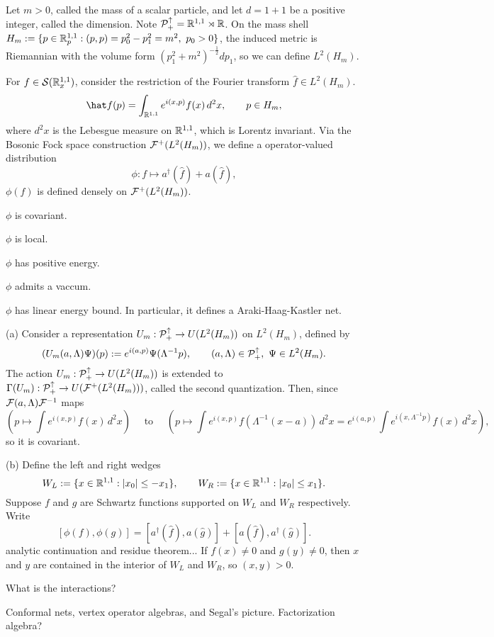 \documentclass{../../large}
\begin{document}
\begin{prb}
Let $m>0$, called the mass of a scalar particle, and let $d=1+1$ be a positive integer, called the dimension.
Note $\mathcal{P}_+^\uparrow=\mathbb{R}^{1,1}\rtimes\mathbb{R}$.
On the mass shell $H_m:=\{p\in\R^{1,1}_p:(p,p)=p_0^2-p_1^2=m^2,\ p_0>0\}$, the induced metric is Riemannian with the volume form $(p_1^2+m^2)^{-\frac12}dp_1$, so we can define $L^2(H_m)$.

For $f\in\mathcal{S}(\mathbb{R}^{1,1}_x)$, consider the restriction of the Fourier transform $\hat f\in L^2(H_m)$.
\[\hat f(p)=\int_{\R^{1,1}}e^{i(x,p)}f(x)\,d^2x,\qquad p\in H_m,\]
where $d^2x$ is the Lebesgue measure on $\mathbb{R}^{1,1}$, which is Lorentz invariant.
Via the Bosonic Fock space construction $\mathcal{F}^+(L^2(H_m))$, we define a operator-valued distribution
\[\phi:f\mapsto a^\dagger(\hat f)+a(\hat f),\]
$\phi(f)$ is defined densely on $\mathcal{F}^+(L^2(H_m))$.


\begin{parts}
\item $\phi$ is covariant.
\item $\phi$ is local.
\item $\phi$ has positive energy.
\item $\phi$ admits a vaccum.
\item $\phi$ has linear energy bound. In particular, it defines a Araki-Haag-Kastler net.
\end{parts}
\end{prb}
\begin{pf}
(a)
Consider a representation $U_m:\mathcal{P}_+^\uparrow\to U(L^2(H_m))$ on $L^2(H_m)$, defined by
\[(U_m(a,\Lambda)\Psi)(p):=e^{i(a,p)}\Psi(\Lambda^{-1}p),\qquad(a,\Lambda)\in\cP_+^\uparrow,\ \Psi\in L^2(H_m).\]
The action $U_m:\mathcal{P}_+^\uparrow\to U(L^2(H_m))$ is extended to $\Gamma(U_m):\mathcal{P}_+^\uparrow\to U(\mathcal{F}^+(L^2(H_m)))$, called the second quantization.
Then, since $\mathcal{F}(a,\Lambda)\mathcal{F}^{-1}$ maps
\[(p\mapsto\int e^{i(x,p)}f(x)\,d^2x)\quad\text{ to }\quad(p\mapsto\int e^{i(x,p)}f(\Lambda^{-1}(x-a))\,d^2x=e^{i(a,p)}\int e^{i(x,\Lambda^{-1}p)}f(x)\,d^2x),\]
so it is covariant.

(b)
Define the left and right wedges
\[W_L:=\{x\in\mathbb{R}^{1,1}:|x_0|\le-x_1\},\qquad W_R:=\{x\in\mathbb{R}^{1,1}:|x_0|\le x_1\}.\]
Suppose $f$ and $g$ are Schwartz functions supported on $W_L$ and $W_R$ respectively.
Write
\[[\phi(f),\phi(g)]=[a^\dagger(\hat f),a(\hat g)]+[a(\hat f),a^\dagger(\hat g)].\]
analytic continuation and residue theorem...
If $f(x)\ne0$ and $g(y)\ne0$, then $x$ and $y$ are contained in the interior of $W_L$ and $W_R$, so $(x,y)>0$.

\end{pf}


What is the interactions?


Conformal nets, vertex operator algebras, and Segal's picture.
Factorization algebra?
\end{document}
